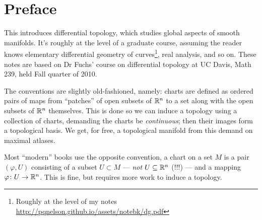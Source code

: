 \chapter{Preface}

This introduces differential topology, which studies global aspects of
smooth manifolds. It's roughly at the level of a graduate course,
assuming the reader knows elementary differential geometry of
curves\footnote{Roughly at the level of my notes \url{http://pqnelson.github.io/assets/notebk/dg.pdf}},
real analysis, and so on. These notes are based on Dr Fuchs' course on
differential topology at UC Davis, Math 239, held Fall quarter of 2010.

The conventions are slightly old-fashioned, namely: charts are defined
as ordered pairs of maps from ``patches'' of open subsets of $\mathbb{R}^{n}$
to a set along with the open subsets of $\mathbb{R}^{n}$ themselves. This is
done so we can induce a topology using a collection of charts, demanding
the charts be \emph{continuous}; then their images form a topological
basis. We get, for free, a topological manifold from this demand on
maximal atlases.

Most ``modern'' books use the opposite convention, a chart on a set $M$
is a pair $(\varphi,U)$ consisting of a subset $U\subset M$ --- \emph{not}
$U\subseteq\mathbb{R}^{n}$ (!!!) --- and a mapping $\varphi\colon U\to\mathbb{R}^{n}$.
This is fine, but requires more work to induce a topology.